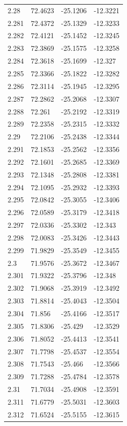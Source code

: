 \begin{tabular}{llll}
2.28 & 72.4623 & -25.1206 & -12.3221 \\
2.281 & 72.4372 & -25.1329 & -12.3233 \\
2.282 & 72.4121 & -25.1452 & -12.3245 \\
2.283 & 72.3869 & -25.1575 & -12.3258 \\
2.284 & 72.3618 & -25.1699 & -12.327 \\
2.285 & 72.3366 & -25.1822 & -12.3282 \\
2.286 & 72.3114 & -25.1945 & -12.3295 \\
2.287 & 72.2862 & -25.2068 & -12.3307 \\
2.288 & 72.261 & -25.2192 & -12.3319 \\
2.289 & 72.2358 & -25.2315 & -12.3332 \\
2.29 & 72.2106 & -25.2438 & -12.3344 \\
2.291 & 72.1853 & -25.2562 & -12.3356 \\
2.292 & 72.1601 & -25.2685 & -12.3369 \\
2.293 & 72.1348 & -25.2808 & -12.3381 \\
2.294 & 72.1095 & -25.2932 & -12.3393 \\
2.295 & 72.0842 & -25.3055 & -12.3406 \\
2.296 & 72.0589 & -25.3179 & -12.3418 \\
2.297 & 72.0336 & -25.3302 & -12.343 \\
2.298 & 72.0083 & -25.3426 & -12.3443 \\
2.299 & 71.9829 & -25.3549 & -12.3455 \\
2.3 & 71.9576 & -25.3672 & -12.3467 \\
2.301 & 71.9322 & -25.3796 & -12.348 \\
2.302 & 71.9068 & -25.3919 & -12.3492 \\
2.303 & 71.8814 & -25.4043 & -12.3504 \\
2.304 & 71.856 & -25.4166 & -12.3517 \\
2.305 & 71.8306 & -25.429 & -12.3529 \\
2.306 & 71.8052 & -25.4413 & -12.3541 \\
2.307 & 71.7798 & -25.4537 & -12.3554 \\
2.308 & 71.7543 & -25.466 & -12.3566 \\
2.309 & 71.7288 & -25.4784 & -12.3578 \\
2.31 & 71.7034 & -25.4908 & -12.3591 \\
2.311 & 71.6779 & -25.5031 & -12.3603 \\
2.312 & 71.6524 & -25.5155 & -12.3615 \\

\end{tabular}
